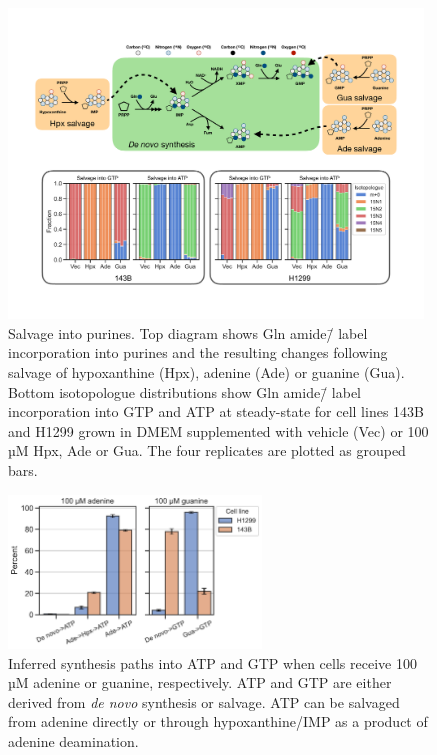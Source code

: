 \begin{figure}
    \centering
    \includegraphics[width=0.98\textwidth]{figures/chap2/sal_frac_pur.pdf}
    \caption[Salvage into purines.]{
    Salvage into purines.
    Top diagram shows Gln amide\=/\hNi{} label incorporation into purines and the resulting changes following salvage of hypoxanthine (Hpx), adenine (Ade) or guanine (Gua).
    Bottom isotopologue distributions show Gln amide\=/\hNi{} label incorporation into GTP and ATP at steady-state for cell lines 143B and H1299 grown in DMEM supplemented with vehicle (Vec) or 100 µM Hpx, Ade or Gua.
    The four replicates are plotted as grouped bars.
    }
    \label{fig:ch2:sal_frac_pur}
\end{figure}

\begin{figure}
    \centering
    \includegraphics[width=0.6\textwidth]{figures/chap2/sal_frac_pur_paths.pdf}
    \caption[Inferred synthesis paths into purines.]{
    Inferred synthesis paths into ATP and GTP when cells receive 100 µM adenine or guanine, respectively.
    ATP and GTP are either derived from \textit{de novo} synthesis or salvage.
    ATP can be salvaged from adenine directly or through hypoxanthine/IMP as a product of adenine deamination.
    }
    \label{fig:ch2:sal_frac_pur_paths}
\end{figure}




